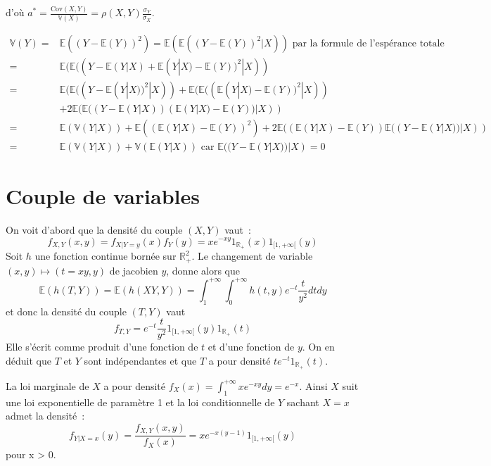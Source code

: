 d'où
\(a^* = \frac{\text{Cov}(X,Y)}{\mathbb{V}(X)} = \rho(X,Y)\frac{\sigma_Y}{\sigma_X}.\)

\label{III-answer-vartot}

\begin{align*}
\mathbb{V}(Y) =& \mathbb{E}((Y-\mathbb{E}(Y))^2) = \mathbb{E}(\mathbb{E}((Y-\mathbb{E}(Y))^2|X)) \text{   par la formule de l'espérance totale}\\
=& \mathbb{E}(\mathbb{E}((Y-\mathbb{E}(Y|X)+\mathbb{E}(Y|X)-\mathbb{E}(Y))^2|X)) \\
=& \mathbb{E}(\mathbb{E}((Y-\mathbb{E}(Y|X))^2|X)) + \mathbb{E}(\mathbb{E}((\mathbb{E}(Y|X)-\mathbb{E}(Y))^2|X)) \\
 &+ 2\mathbb{E}(\mathbb{E}((Y-\mathbb{E}(Y|X))(\mathbb{E}(Y|X)-\mathbb{E}(Y))|X))\\
=& \mathbb{E}(\mathbb{V}(Y|X)) + \mathbb{E}((\mathbb{E}(Y|X)-\mathbb{E}(Y))^2) + 2\mathbb{E}((\mathbb{E}(Y|X)-\mathbb{E}(Y))\mathbb{E}((Y-\mathbb{E}(Y|X))|X))\\
=& \mathbb{E}(\mathbb{V}(Y|X)) + \mathbb{V}(\mathbb{E}(Y|X)) \text{   car    } \mathbb{E}((Y-\mathbb{E}(Y|X))|X) = 0 
\end{align*}

\section{Couple de variables}\label{III-couple-de-variables-1}

\label{III-answer-ex1-1}
On voit d'abord que la densité du couple \((X,Y)\) vaut~:
\[f_{X,Y}(x,y) = f_{X|Y=y}(x)f_Y(y) = xe^{-xy}1_{\mathbb{R}_+}(x) 1_{[1,+\infty[} (y)\]
Soit \(h\) une fonction continue bornée sur \(\mathbb{R}^2_+\). Le
changement de variable \((x, y) \mapsto (t = xy , y)\) de jacobien
\(y\), donne alors que
\[\mathbb{E}(h(T, Y )) = \mathbb{E}(h(XY, Y )) = \int_1^{+\infty}\int_0^{+\infty} h(t,y) e^{-t} \frac{t}{y^2} dt dy\]
et donc la densité du couple \((T, Y)\) vaut
\[f_{T,Y} = e^{-t} \frac{t}{y^2}1_{[1,+\infty[} (y)1_{\mathbb{R}_+}(t)\]
Elle s'écrit comme produit d'une fonction de \(t\) et d'une fonction de
\(y\). On en déduit que \(T\) et \(Y\) sont indépendantes et que \(T\) a
pour densité \(te^{-t} 1_{\mathbb{R}_+}(t)\).

\label{III-answer-ex1-2}
La loi marginale de \(X\) a pour densité
\(f_X (x) = \int_1^{+\infty} x e^{-xy} dy = e^{-x}\). Ainsi \(X\) suit
une loi exponentielle de paramètre 1 et la loi conditionnelle de \(Y\)
sachant \(X = x\) admet la densité~:
\[f_{Y|X=x}(y) = \frac{f_{X,Y}(x,y)}{f_X(x)} = x e^{-x(y-1)} 1_{[1,+\infty[} (y)\]
pour x \textgreater{} 0.


